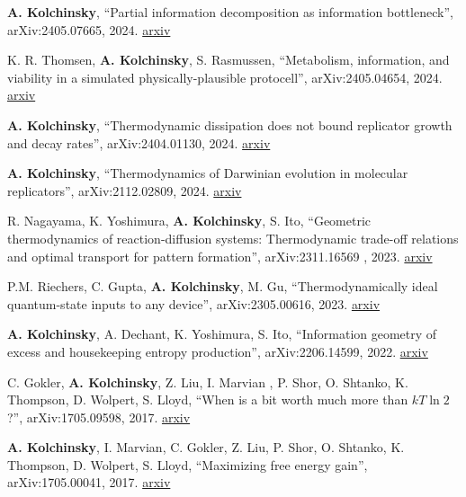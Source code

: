 
\textbf{A. Kolchinsky}, ``Partial information decomposition as information bottleneck'', arXiv:2405.07665, 2024. \href{http://arxiv.org/abs/2405.07665}{arxiv}

K. R. Thomsen, \textbf{A. Kolchinsky}, S. Rasmussen, ``Metabolism, information, and viability in a simulated physically-plausible protocell'', arXiv:2405.04654, 2024. \href{http://arxiv.org/abs/2405.04654}{arxiv}

\textbf{A. Kolchinsky}, ``Thermodynamic dissipation does not bound replicator growth and decay rates'', arXiv:2404.01130, 2024. \href{http://arxiv.org/abs/2404.01130}{arxiv} 

\textbf{A. Kolchinsky}, ``Thermodynamics of Darwinian evolution in molecular replicators'', arXiv:2112.02809, 2024. \href{http://arxiv.org/abs/2112.02809}{arxiv} 

R. Nagayama, K. Yoshimura, \textbf{A. Kolchinsky}, S. Ito, ``Geometric thermodynamics of reaction-diffusion systems: Thermodynamic trade-off relations and optimal transport for pattern formation'', arXiv:2311.16569 , 2023. \href{https://arxiv.org/abs/2311.16569}{arxiv}
 
P.M. Riechers, C. Gupta, \textbf{A. Kolchinsky}, M. Gu, ``Thermodynamically ideal quantum-state inputs to any device'', arXiv:2305.00616, 2023. \href{http://arxiv.org/abs/2305.00616}{arxiv}

\textbf{A. Kolchinsky}, A. Dechant, K. Yoshimura, S. Ito, 
``Information geometry of excess and housekeeping entropy production'', arXiv:2206.14599, 2022. \href{https://arxiv.org/abs/2206.14599}{arxiv}

C. Gokler, \textbf{A. Kolchinsky}, Z. Liu, I. Marvian , P. Shor, O. Shtanko, K. Thompson, D. Wolpert, S. Lloyd, ``When is a bit worth much more than $kT \ln 2$?'', arXiv:1705.09598, 2017. \href{https://arxiv.org/abs/1705.09598}{arxiv}

\textbf{A. Kolchinsky}, I. Marvian, C. Gokler, Z. Liu, P. Shor, O. Shtanko, K. Thompson, D. Wolpert, S. Lloyd, ``Maximizing free energy gain'', arXiv:1705.00041, 2017. \href{https://arxiv.org/abs/1705.00041}{arxiv}

